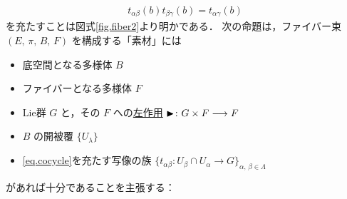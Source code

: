 \documentclass[geometry_main]{subfiles}
\begin{document}
\begin{align}
	\label{eq.cocycle}
	t_{\alpha\beta}(b) t_{\beta\gamma}(b) = t_{\alpha\gamma}(b)
\end{align}
を充たすことは図式\ref{fig.fiber2}より明かである．
次の命題は，ファイバー束 $(E,\, \pi,\, B,\, F)$ を構成する「素材」には
\begin{itemize}
	\item 底空間となる\cinfty 多様体 $B$
	\item ファイバーとなる\cinfty 多様体 $F$
	\item Lie群 $G$ と，その $F$ への\hyperref[def:Lie-action]{左作用} $\blacktriangleright \colon G \times F \longrightarrow F$
	\item $B$ の開被覆 $\{ U_\lambda \}$
	\item \eqref{eq.cocycle}を充たす\cinfty 写像の族 $\{t_{\alpha\beta} \colon U_\beta \cap U_\alpha \to G\}_{\alpha,\, \beta \in \Lambda}$
\end{itemize}
があれば十分であることを主張する：
\end{document}
